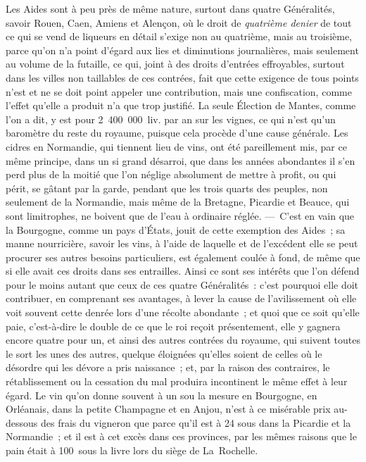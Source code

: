 \documentclass[french,twoside]{book} %
\begin{document}
Les Aides sont à peu près de même nature, surtout dans quatre Généralités, savoir Rouen, Caen, Amiens et Alençon, où le droit de {\itshape quatrième denier} de tout ce qui se vend de liqueurs en détail s’exige non au quatrième, mais au troisième, parce qu’on n’a point d’égard aux lies et diminutions journalières, mais seulement au volume de la futaille, ce qui, joint à des droits d’entrées effroyables, surtout dans les villes non taillables de ces contrées, fait que cette exigence de tous points n’est et ne se doit point appeler une contribution, mais une confiscation, comme l’effet qu’elle a produit n’a que trop justifié. La seule Élection de Mantes, comme l’on a dit, y est pour 2 400 000 liv. par an sur les vignes, ce qui n’est qu’un baromètre du reste du royaume, puisque cela procède d’une cause générale. Les cidres en Normandie, qui tiennent lieu de vins, ont été pareillement mis, par ce même principe, dans un si grand désarroi, que dans les années abondantes il s’en perd plus de la moitié que l’on néglige absolument de mettre à profit, ou qui périt, se gâtant par la garde, pendant que les trois quarts des peuples, non seulement de la Normandie, mais même de la Bretagne, Picardie et Beauce, qui sont limitrophes, ne boivent que de l’eau à ordinaire réglée. — C’est en vain que la Bourgogne, comme un pays d’États, jouit de cette exemption des Aides ; sa manne nourricière, savoir les vins, à l’aide de laquelle et de l’excédent elle se peut procurer ses autres besoins particuliers, est également coulée à fond, de même que si elle avait ces droits dans ses entrailles. Ainsi ce sont ses intérêts que l’on défend pour le moins autant que ceux de ces quatre Généralités : c’est pourquoi elle doit contribuer, en comprenant ses avantages, à lever la cause de l’avilissement où elle voit souvent cette denrée lors d’une récolte abondante ; et quoi que ce soit qu’elle paie, c’est-à-dire le double de ce que le roi reçoit présentement, elle y gagnera encore quatre pour un, et ainsi des autres contrées du royaume, qui suivent toutes le sort les unes des autres, quelque éloignées qu’elles soient de celles où le désordre qui les dévore a pris naissance ; et, par la raison des contraires, le rétablissement ou la cessation du mal produira incontinent le même effet à leur égard. Le vin qu’on donne souvent à un sou la mesure en Bourgogne, en Orléanais, dans la petite Champagne et en Anjou, n’est à ce misérable prix au-dessous des frais du vigneron que parce qu’il est à 24 sous dans la Picardie et la Normandie ; et il est à cet excès dans ces provinces, par les mêmes raisons que le pain était à 100 sous la livre lors du siège de La Rochelle.\par
\end{document}

